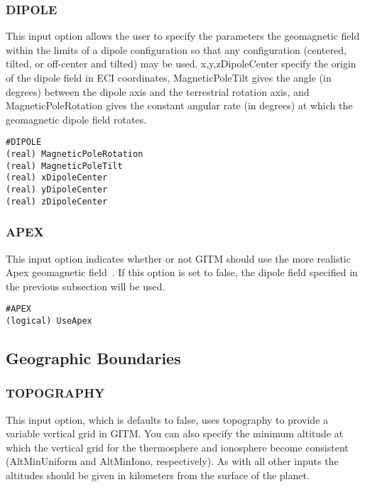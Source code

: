 \subsubsection{DIPOLE}
\label{dipole.sec}

This input option allows the user to specify the parameters the geomagnetic field within the limits of a dipole configuration so that any configuration (centered, tilted, or off-center and tilted) may be used.  x,y,zDipoleCenter specify the origin of the dipole field in ECI coordinates, MagneticPoleTilt gives the angle (in degrees) between the dipole axis and the terrestrial rotation axis, and MagneticPoleRotation gives the constant angular rate (in degrees) at which the geomagnetic dipole field rotates.

\begin{verbatim}
#DIPOLE
(real) MagneticPoleRotation 
(real) MagneticPoleTilt   
(real) xDipoleCenter       
(real) yDipoleCenter       
(real) zDipoleCenter       
\end{verbatim}

\subsubsection{APEX}
\label{apex.sec}

This input option indicates whether or not GITM should use the more realistic Apex geomagnetic field~\citep{richards:1995aa}.  If this option is set to false, the dipole field specified in the previous subsection will be used.

\begin{verbatim}
#APEX
(logical) UseApex
\end{verbatim}


\subsection{Geographic Boundaries}
\label{geograph.sec}

\subsubsection{TOPOGRAPHY}

This input option, which is defaults to false, uses topography to provide a variable vertical grid in GITM.  You can also specify the minimum altitude at which the vertical grid for the thermosphere and ionosphere become consistent (AltMinUniform and AltMinIono, respectively).  As with all other inputs the altitudes should be given in kilometers from the surface of the planet.

